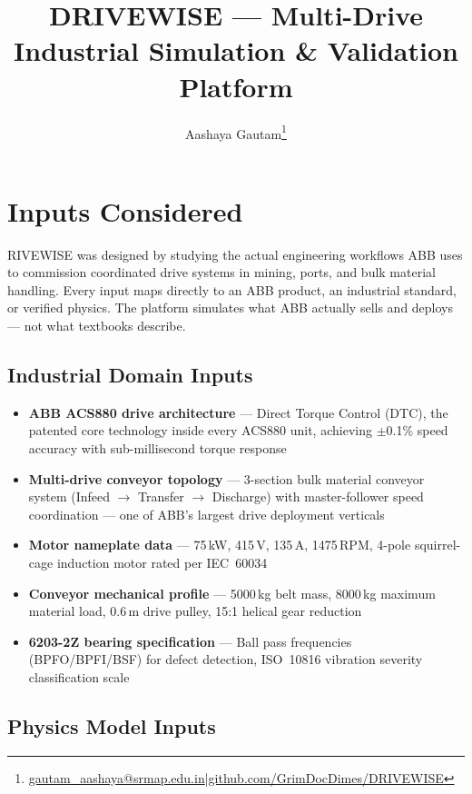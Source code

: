 \documentclass[9pt,a4paper,twocolumn,twoside]{tau-class/tau}
\title{DRIVEWISE — Multi-Drive Industrial Simulation \& Validation Platform}
\author[a,1]{Aashaya Gautam\thanks{\href{mailto:gautam_aashaya@srmap.edu.in}{gautam\_aashaya@srmap.edu.in}\enspace|\enspace\href{https://github.com/GrimDocDimes/DRIVEWISE}{github.com/GrimDocDimes/DRIVEWISE}}}
\begin{document}
\maketitle
\thispagestyle{firststyle}


\section{Inputs Considered}

RIVEWISE was designed by studying the actual engineering workflows ABB uses to commission coordinated drive systems in mining, ports, and bulk material handling. Every input maps directly to an ABB product, an industrial standard, or verified physics. The platform simulates what ABB actually sells and deploys — not what textbooks describe.

\subsection{Industrial Domain Inputs}

\begin{itemize}
    \item \textbf{ABB ACS880 drive architecture} — Direct Torque Control (DTC), the patented core technology inside every ACS880 unit, achieving $\pm$0.1\% speed accuracy with sub-millisecond torque response
    \item \textbf{Multi-drive conveyor topology} — 3-section bulk material conveyor system (Infeed $\rightarrow$ Transfer $\rightarrow$ Discharge) with master-follower speed coordination — one of ABB's largest drive deployment verticals
    \item \textbf{Motor nameplate data} — 75\,kW, 415\,V, 135\,A, 1475\,RPM, 4-pole squirrel-cage induction motor rated per IEC~60034
    \item \textbf{Conveyor mechanical profile} — 5000\,kg belt mass, 8000\,kg maximum material load, 0.6\,m drive pulley, 15:1 helical gear reduction
    \item \textbf{6203-2Z bearing specification} — Ball pass frequencies (BPFO/BPFI/BSF) for defect detection, ISO~10816 vibration severity classification scale
\end{itemize}

\subsection{Physics Model Inputs}
\end{document}
